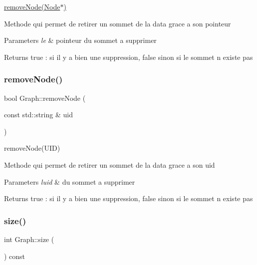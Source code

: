 \mbox{\hyperlink{class_graph_a32b254ea9535f8f4ad831d129db525e8}{remove\+Node(\+Node$\ast$)}} 

Methode qui permet de retirer un sommet de la data grace a son pointeur


\begin{DoxyParams}{Parameters}
{\em le} & pointeur du sommet a supprimer\\
\hline
\end{DoxyParams}
\begin{DoxyReturn}{Returns}
true \+: si il y a bien une suppression, false sinon si le sommet n existe pas 
\end{DoxyReturn}
\mbox{\label{class_graph_a1c30c580ccc957167dc64ca1a9e19248}} 
\subsubsection{\texorpdfstring{remove\+Node()}{removeNode()}\hspace{0.1cm}{\footnotesize\ttfamily [2/2]}}
{\footnotesize\ttfamily bool Graph\+::remove\+Node (\begin{DoxyParamCaption}\item[{const std\+::string \&}]{uid }\end{DoxyParamCaption})}



remove\+Node(\+U\+I\+D) 

Methode qui permet de retirer un sommet de la data grace a son uid


\begin{DoxyParams}{Parameters}
{\em l\textquotesingle{}uid} & du sommet a supprimer\\
\hline
\end{DoxyParams}
\begin{DoxyReturn}{Returns}
true \+: si il y a bien une suppression, false sinon si le sommet n existe pas 
\end{DoxyReturn}
\mbox{\label{class_graph_a6539d03f6d3f42042196f0f79455bdd8}} 
\subsubsection{\texorpdfstring{size()}{size()}}
{\footnotesize\ttfamily int Graph\+::size (\begin{DoxyParamCaption}{ }\end{DoxyParamCaption}) const}



